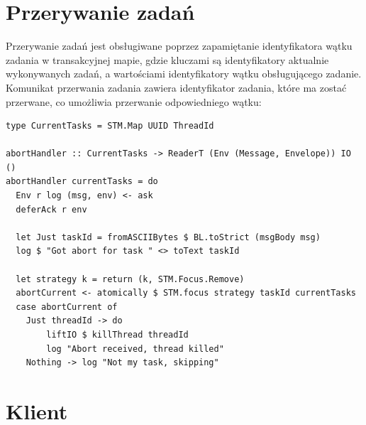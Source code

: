 \section{Przerywanie zadań}
Przerywanie zadań jest obsługiwane poprzez zapamiętanie identyfikatora wątku zadania w transakcyjnej mapie\cite{STMMap}, gdzie kluczami są identyfikatory aktualnie wykonywanych zadań, a wartościami identyfikatory wątku obsługującego zadanie. Komunikat przerwania zadania zawiera identyfikator zadania, które ma zostać przerwane, co umożliwia przerwanie odpowiedniego wątku:
\begin{lstlisting}
type CurrentTasks = STM.Map UUID ThreadId

abortHandler :: CurrentTasks -> ReaderT (Env (Message, Envelope)) IO ()
abortHandler currentTasks = do
  Env r log (msg, env) <- ask
  deferAck r env

  let Just taskId = fromASCIIBytes $ BL.toStrict (msgBody msg)
  log $ "Got abort for task " <> toText taskId

  let strategy k = return (k, STM.Focus.Remove)
  abortCurrent <- atomically $ STM.focus strategy taskId currentTasks
  case abortCurrent of
    Just threadId -> do
        liftIO $ killThread threadId
        log "Abort received, thread killed"
    Nothing -> log "Not my task, skipping"
\end{lstlisting}

\section{Klient}